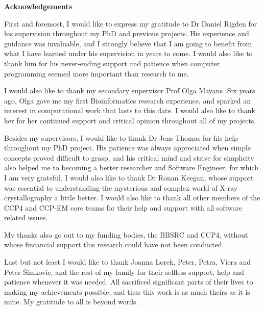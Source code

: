 \begin{center}
    \LARGE
    \textbf{Acknowledgements}
    \vspace{0.5cm}
\end{center}

First and foremost, I would like to express my gratitude to Dr Daniel Rigden for his supervision throughout my PhD and previous projects. His experience and guidance was invaluable, and I strongly believe that I am going to benefit from what I have learned under his supervision in years to come. I would also like to thank him for his never-ending support and patience when computer programming seemed more important than research to me.

I would also like to thank my secondary supervisor Prof Olga Mayans. Six years ago, Olga gave me my first Bioinformatics research experience, and sparked an interest in computational work that lasts to this date. I would also like to thank her for her continued support and critical opinion throughout all of my projects.

Besides my supervisors, I would like to thank Dr Jens Thomas for his help throughout my PhD project. His patience was always appreciated when simple concepts proved difficult to grasp, and his critical mind and strive for simplicity also helped me to becoming a better researcher and Software Engineer, for which I am very grateful. I would also like to thank Dr Ronan Keegan, whose support was essential to understanding the mysterious and complex world of X-ray crystallography a little better. I would also like to thank all other members of the CCP4 and CCP-EM core teams for their help and support with all software related issues.

My thanks also go out to my funding bodies, the BBSRC and CCP4, without whose fincancial support this research could have not been conducted.

Last but not least I would like to thank Joanna Lorek, Peter, Petra, Viera and Peter \v{S}imkovic, and the rest of my family for their selfless support, help and patience whenever it was needed. All sacrificed significant parts of their lives to making my achievements possible, and thus this work is as much theirs as it is mine. My gratitude to all is beyond words.

